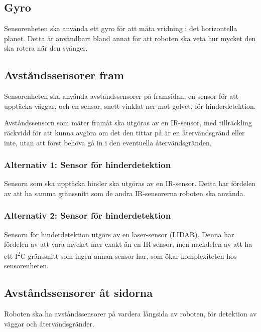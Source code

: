 \documentclass[a4paper,titlepage,12pt]{article}
\newcommand{\itc}{I\textsuperscript{2}C}
\begin{document}
    \subsection{Gyro}
    
    Sensorenheten ska använda ett gyro för att mäta vridning i det horizontella
    planet. Detta är användbart bland annat för att roboten ska veta hur mycket
    den ska rotera när den svänger.
    
    \subsection{Avståndssensorer fram}
    
    Sensorenheten ska använda avståndssensorer på framsidan, en sensor för att
    upptäcka väggar, och en sensor, snett vinklat ner mot golvet, för hinderdetektion. 

    Avståndssensorn som mäter framåt ska utgöras av en IR-sensor, med
    tillräckling räckvidd för att kunna avgöra om det den tittar på är en
    återvändsgränd eller inte, utan att först behöva gå in i den eventuella
    återvändsgränden.

    \subsubsection{Alternativ 1: Sensor för hinderdetektion}

    Sensorn som ska upptäcka hinder ska utgöras av en IR-sensor. Detta
    har fördelen av att ha samma gränssnitt som de andra IR-sensorerna roboten
    ska använda.

    \subsubsection{Alternativ 2: Sensor för hinderdetektion}

    Sensorn för hinderdetektion utgörs av en laser-sensor (LIDAR). Denna har
    fördelen av att vara mycket mer exakt än en IR-sensor, men nackdelen av att
    ha ett \itc{}-gränssnitt som ingen annan sensor har, som ökar
    komplexiteten hos sensorenheten.

    \subsection{Avståndssensorer åt sidorna}
    Roboten ska ha avståndssensorer på vardera långsida av roboten, för
    detektion av väggar och återvändsgränder.
\end{document}
